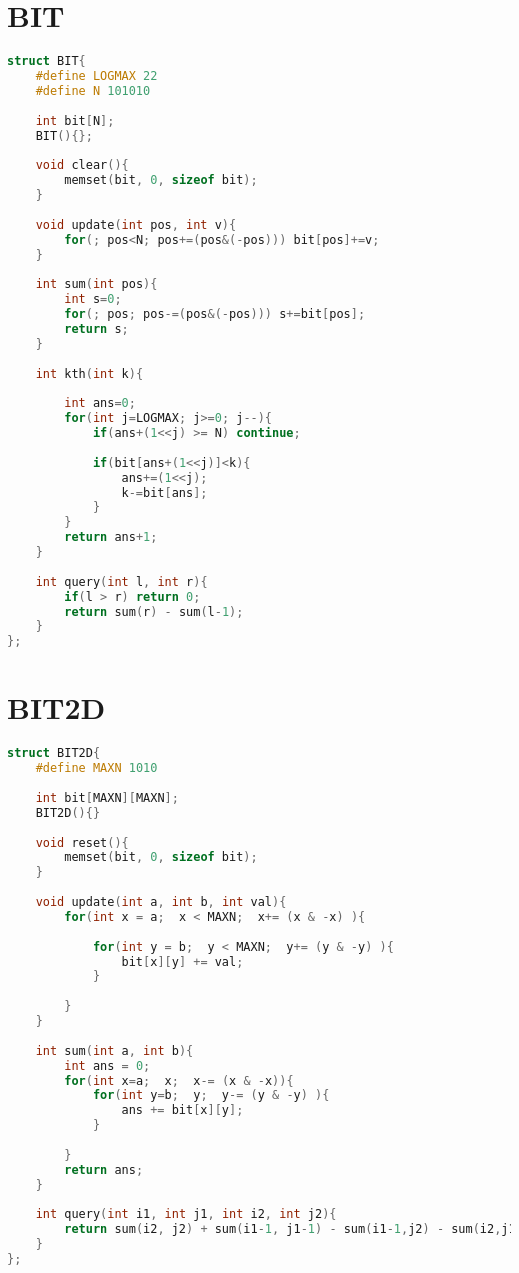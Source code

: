 \documentclass[12pt,a4paper,twoside]{report}
\begin{document}
\section{BIT}
\noindent\begin{lstlisting}[caption=BIT,language=C++]
struct BIT{
    #define LOGMAX 22
    #define N 101010
     
    int bit[N];
    BIT(){};
     
    void clear(){
        memset(bit, 0, sizeof bit);
    }
     
    void update(int pos, int v){
        for(; pos<N; pos+=(pos&(-pos))) bit[pos]+=v;
    }
 
    int sum(int pos){
        int s=0;
        for(; pos; pos-=(pos&(-pos))) s+=bit[pos];
        return s;
    }
     
    int kth(int k){
         
        int ans=0;
        for(int j=LOGMAX; j>=0; j--){
            if(ans+(1<<j) >= N) continue;
             
            if(bit[ans+(1<<j)]<k){
                ans+=(1<<j);
                k-=bit[ans];
            }
        }
        return ans+1;
    }
     
    int query(int l, int r){
        if(l > r) return 0;
        return sum(r) - sum(l-1);
    }
};
\end{lstlisting}

\section{BIT2D}
\noindent\begin{lstlisting}[caption=BIT2D,language=C++]
struct BIT2D{
    #define MAXN 1010
     
    int bit[MAXN][MAXN];
    BIT2D(){}
      
    void reset(){
        memset(bit, 0, sizeof bit);
    }
      
    void update(int a, int b, int val){
        for(int x = a;  x < MAXN;  x+= (x & -x) ){
         
            for(int y = b;  y < MAXN;  y+= (y & -y) ){
                bit[x][y] += val;
            }
         
        }
    }
      
    int sum(int a, int b){
        int ans = 0;
        for(int x=a;  x;  x-= (x & -x)){         
            for(int y=b;  y;  y-= (y & -y) ){
                ans += bit[x][y];
            }
             
        }
        return ans;
    }
      
    int query(int i1, int j1, int i2, int j2){
        return sum(i2, j2) + sum(i1-1, j1-1) - sum(i1-1,j2) - sum(i2,j1-1);
    }
};
\end{lstlisting}
\end{document}
